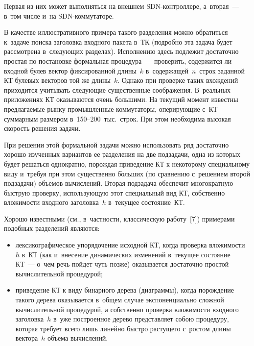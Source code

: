 \begin{multicols}{2}
  Первая из них может выполняться на внешнем SDN-конт\-рол\-ле\-ре, 
а~вторая~--- в~том числе и~на SDN-ком\-му\-та\-торе.
  
  В качестве иллюстративного примера такого разделения можно обратиться 
к~задаче поиска заголовка входного пакета в~ТК (по\-дроб\-но 
эта задача будет рассмотрена в~следующих разделах). 
Исполнению здесь подлежит достаточно простая по постановке формальная 
процедура~--- проверить, содержится ли входной булев вектор фиксированной 
длины~$k$ в~содержащей~$n$~строк заданной КТ 
булевых векторов той же длины~$k$. Однако при проверке таких вхождений 
приходится учитывать следующие существенные соображения. В~реальных 
приложениях КТ оказываются очень большими. На текущий момент 
известны предлагаемые рынку промышленные коммутаторы, оперирующие 
с~КТ суммар\-ным размером в~150--200~тыс.\ строк. При этом необходима 
высокая скорость решения задачи.
{

}
  
  При решении этой формальной задачи \mbox{можно} использовать ряд достаточно 
хорошо изученных вариан\-тов ее разделения на две подзадачи, одна из которых 
будет решаться однократно, порождая приведение КТ к некоторому 
специальному виду и~требуя при этом существенно б$\acute{\mbox{о}}$льших (по сравнению 
с~решением второй подзадачи) объемов вычисле\-ний. Вторая подзадача 
обеспечит многократную быструю проверку, использующую этот специальный 
вид КТ, собственно вложимости входного заголовка~$h$ в~текущее 
состояние~КТ.
  
  Хорошо известными (см., в~частности, классическую работу~[7]) примерами 
подобных разделений являются:
\begin{itemize}
\item лексикографическое упорядочение исходной КТ, когда проверка 
вложимости~$h$ в~КТ (как и~внесение динамических изменений в~текущее 
состояние КТ~--- о~чем речь пойдет чуть позже) оказывается достаточно 
простой вычислительной процедурой; 
\item приведение КТ к виду бинарного дерева (диаграммы), когда 
порождение такого дерева оказывается в~общем случае экспоненциально 
сложной вычислительной процедурой, а собственно проверка вложимости 
входного заголовка~$h$ в~уже построенное дерево представляет собою 
процедуру, которая требует всего лишь линейно быстро растущего с~ростом 
длины вектора~$h$ объема вычислений.
\end{itemize}


\end{multicols}
